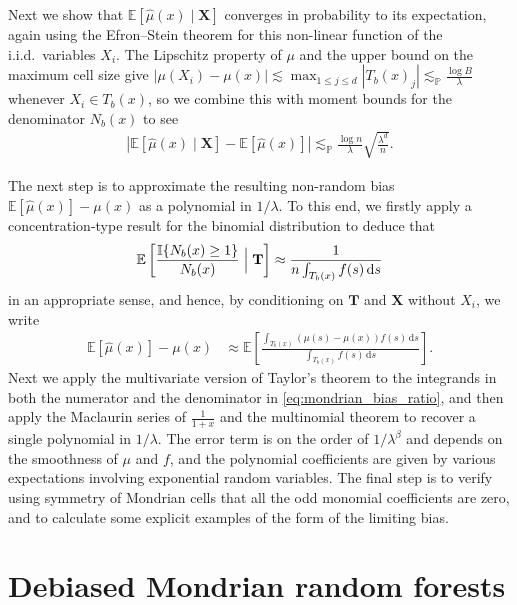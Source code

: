 \documentclass[11pt,lof]{puthesis}
\renewcommand{\P}{\ensuremath{\mathbb{P}}}
\newcommand{\E}{\ensuremath{\mathbb{E}}}
\newcommand{\I}{\ensuremath{\mathbb{I}}}
\newcommand{\bX}{\ensuremath{\mathbf{X}}}
\newcommand{\bT}{\ensuremath{\mathbf{T}}}
\newcommand{\diff}[1]{\,\mathrm{d}#1}
\theoremstyle{break}
\theoremstyle{proof}
\begin{document}
Next we show that $\E \left[ \hat \mu(x) \mid \bX \right]$ converges in
probability to its expectation, again using the Efron--Stein theorem for this
non-linear function of the i.i.d.\ variables $X_i$. The Lipschitz property of
$\mu$ and the upper bound on the maximum cell size give
$|\mu(X_i) - \mu(x)| \lesssim \max_{1 \leq j \leq d} |T_b(x)_j|
\lesssim_\P \frac{\log B}{\lambda}$
whenever $X_i \in T_b(x)$,
so we combine this with moment bounds for the denominator $N_b(x)$ to see
%
\begin{align*}
  \left|
    \E \left[ \hat \mu(x) \mid \bX \right]
    - \E \left[ \hat \mu(x) \right]
  \right|
  \lesssim_\P
  \frac{\log n}{\lambda} \sqrt{\frac{\lambda^d}{n}}.
\end{align*}

The next step is to approximate the resulting non-random bias
$\E \left[ \hat \mu(x) \right] - \mu(x)$ as a polynomial in $1/\lambda$.
To this end, we firstly apply a concentration-type result for the binomial
distribution to deduce that
%
\begin{align*}
  \E \left[ \frac{\I\{N_b(x) \geq 1\}}{N_b(x)} \Bigm| \bT \right]
  \approx \frac{1}{n \int_{T_b(x)} f(s) \diff s}
\end{align*}
%
in an appropriate sense, and hence,
by conditioning on $\bT$ and $\bX$ without $X_i$, we write
%
\begin{align}
  \label{eq:mondrian_bias_ratio}
  \E \left[ \hat \mu(x) \right] - \mu(x)
  &\approx
  \E \left[
    \frac{\int_{T_b(x)} (\mu(s) - \mu(x)) f(s) \diff s}
    {\int_{T_b(x)} f(s) \diff s}
  \right].
\end{align}
%
Next we apply the multivariate version of Taylor's theorem to the integrands in
both the numerator and the denominator in \eqref{eq:mondrian_bias_ratio}, and
then apply
the Maclaurin series of $\frac{1}{1+x}$ and the multinomial theorem to recover
a single polynomial in $1/\lambda$. The error term is on the order of
$1/\lambda^\beta$ and depends on the smoothness of $\mu$ and $f$, and the
polynomial coefficients are given by various expectations involving exponential
random variables. The final step is to verify using symmetry of Mondrian cells
that all the odd monomial coefficients are zero, and to calculate some explicit
examples of the form of the limiting bias.

\section{Debiased Mondrian random forests}%
\label{sec:mondrian_debiased}
\end{document}
